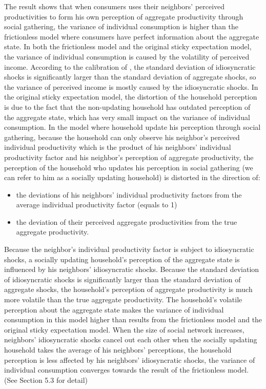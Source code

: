 \documentclass[12pt,letterpaper]{article}
\begin{document}
The result shows that when consumers uses their neighbors' perceived productivities to form his own perception of aggregate productivity through social gathering, the variance of individual consumption is higher than the frictionless model where consumers have perfect information about the aggregate state. In both the frictionless model and the original sticky expectation model, the variance of individual consumption is caused by the volatility of perceived income. According to the calibration of \cite{StickyE}, the standard deviation of idiosyncratic shocks is significantly larger than the standard deviation of aggregate shocks, so the variance of perceived income is mostly caused by the idiosyncratic shocks. In the original sticky expectation model, the distortion of the household perception is due to the fact that the non-updating household has outdated perception of the aggregate state, which has very small impact on the variance of individual consumption. In the model where household update his perception through social gathering, because the household can only observe his neighbor's perceived individual productivity which is the product of his neighbors' individual productivity factor and his neighbor's perception of aggregate productivity, the perception of the household who updates his perception in social gathering (we can refer to him as a socially updating household) is distorted in the direction of:
\begin{itemize}
	\item the deviations of his neighbors' individual productivity factors from the average individual productivity factor (equals to 1)
	\item the deviation of their perceived aggregate productivities from the true aggregate productivity.
\end{itemize}
Because the neighbor's individual productivity factor is subject to idiosyncratic shocks, a socially updating household's perception of the aggregate state is influenced by his neighbors' idiosyncratic shocks. Because the standard deviation of idiosyncratic shocks is significantly larger than the standard deviation of aggregate shocks, the household's perception of aggregate productivity is much more volatile than the true aggregate productivity. The household's volatile perception about the aggregate state makes the variance of individual consumption in this model higher than results from the frictionless model and the original sticky expectation model. When the size of social network increases, neighbors' idiosyncratic shocks cancel out each other when the socially updating household takes the average of his neighbors' perceptions, the household perception is less affected by his neighbors' idiosyncratic shocks, the variance of individual consumption converges towards the result of the frictionless model. (See Section 5.3 for detail)
\end{document}

